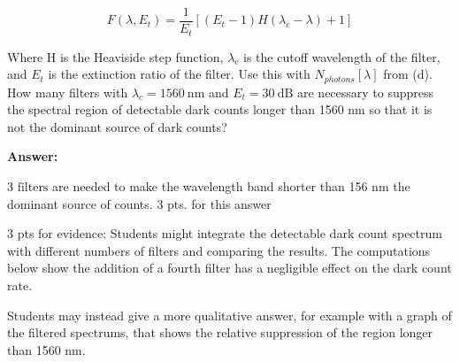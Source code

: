 \documentclass[11pt]{caltech_thesis} %
\begin{document}
\begin{enumerate}
  \[F(\lambda, E_t) = \frac{1}{E_t}[(E_t - 1)H(\lambda_c - \lambda) + 1]\]

  Where H is the Heaviside step function, \(\lambda_c\) is the cutoff
  wavelength of the filter, and \(E_t\) is the extinction ratio of the
  filter. Use this with \(N_{photons}[\lambda]\) from (d). How many
  filters with \(\lambda_c = 1560~\text{nm}\) and \(E_t = 30~\text{dB}\)
  are necessary to suppress the spectral region of detectable dark
  counts longer than 1560 nm so that it is not the dominant source of
  dark counts?

  {\color{midnightblue}  \textbf{Answer:} }

  {\color{midnightblue} \(\boxed{\text{3 filters}}\) are needed to make
  the wavelength band shorter than 156 nm the dominant source of
  counts.} {\color{darkred} 3 pts. for this answer}

  {\color{darkred} 3 pts for evidence:} {\color{midnightblue} Students
  might integrate the detectable dark count spectrum with different
  numbers of filters and comparing the results. The computations below
  show the addition of a fourth filter has a negligible effect on the
  dark count rate. }

  {\color{midnightblue} Students may instead give a more qualitative
  answer, for example with a graph of the filtered spectrums, that shows
  the relative suppression of the region longer than 1560 nm. }


\end{enumerate}
\end{document}
